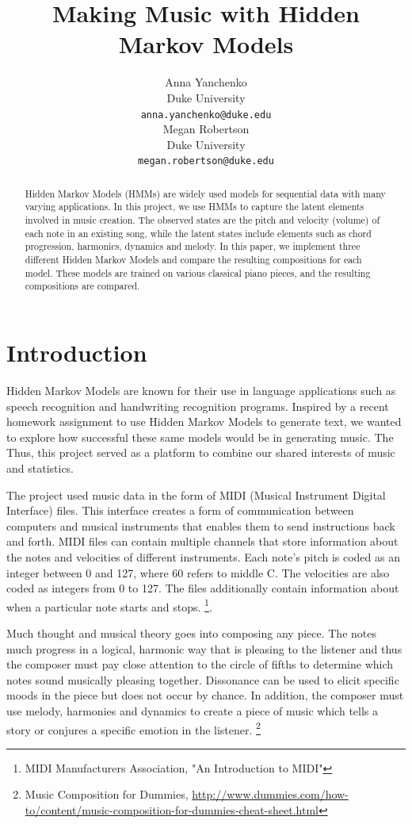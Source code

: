 \documentclass{article} %
\title{Making Music with Hidden Markov Models}
\author{
Anna Yanchenko \\
Duke University\\
\texttt{anna.yanchenko@duke.edu} \\
\And
Megan Robertson \\
Duke University \\
\texttt{megan.robertson@duke.edu} \\
}
\begin{document}
\maketitle

\begin{abstract}
Hidden Markov Models (HMMs) are widely used models for sequential data with many varying applications.  In this project, we use HMMs to capture the latent elements involved in music creation. The observed states are the pitch and velocity (volume) of each note in an existing  song, while the latent states include elements such as chord progression, harmonics, dynamics and melody.  In this paper, we implement three different Hidden Markov Models and compare the resulting compositions for each model. These models are trained on various classical piano pieces, and the resulting compositions are compared.
\end{abstract}
 
\section{Introduction}

Hidden Markov Models are known for their use in language applications such as speech recognition and handwriting recognition programs. Inspired by a recent homework assignment to use Hidden Markov Models to generate text, we wanted to explore how successful these same models would be in generating music.  The Thus,  this project served as a platform to combine our shared interests of music and statistics. 

The project used music data in the form of MIDI (Musical Instrument Digital Interface) files. This interface creates a form of communication between computers and musical instruments that enables them to send instructions back and forth. MIDI files can contain multiple channels that store information about the notes and velocities of different instruments.   Each note's pitch is coded as an integer between 0 and 127, where 60 refers to middle C.  The velocities are also coded as integers from 0 to 127. The files additionally contain information about when a particular note starts and stops. \footnote{MIDI Manufacturers Association, "An Introduction to MIDI"}. 


Much thought and musical theory goes into composing any piece.  The notes much progress in a logical, harmonic way that is pleasing to the listener and thus the composer must pay close attention to the circle of fifths to determine which notes sound musically pleasing together.  Dissonance can be used to elicit specific moods in the piece but does not occur by chance.  In addition, the composer must use melody, harmonies and dynamics to create a piece of music which tells a story or conjures a specific emotion in the listener.  
\footnote{Music Composition for Dummies, \url{http://www.dummies.com/how-to/content/music-composition-for-dummies-cheat-sheet.html}}
\end{document}
